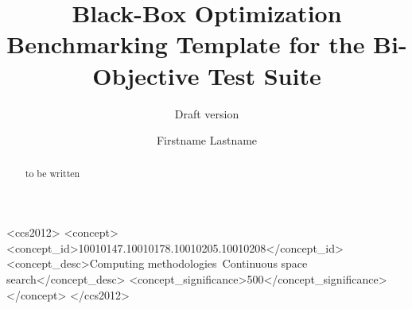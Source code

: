 \documentclass[sigconf]{acmart}
\begin{document}
\title{Black-Box Optimization Benchmarking Template for the Bi-Objective \bbobbiobj Test Suite}
\renewcommand{\shorttitle}{Template for Benchmarking Single Algorithms on the \bbobbiobj Testbed}
\subtitle{Draft version}



\author{Firstname Lastname}
%
%
%
%
%
%
%

\renewcommand{\shortauthors}{Firstname Lastname et. al.}


\begin{abstract}
to be written
\end{abstract}


%
%
 \begin{CCSXML}
<ccs2012>
<concept>
<concept_id>10010147.10010178.10010205.10010208</concept_id>
<concept_desc>Computing methodologies~Continuous space search</concept_desc>
<concept_significance>500</concept_significance>
</concept>
</ccs2012>
\end{CCSXML}
\end{document}
